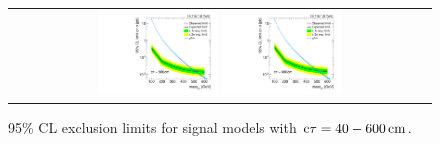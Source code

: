 \begin{figure}[!h]
\begin{tabular}{c}
    \includegraphics[width=0.29\textwidth]{figures/analysis/Interpretation/ExclusionLimits/LimitPlot_ctau500cm.pdf} 
    \includegraphics[width=0.29\textwidth]{figures/analysis/Interpretation/ExclusionLimits/LimitPlot_ctau600cm.pdf} \\
  \end{tabular}
  \caption{95\% CL exclusion limits for signal models with $\text{c}\tau = 40-600\,\text{cm}$.}
  \label{fig:1dLimitsB}
\end{figure} 

